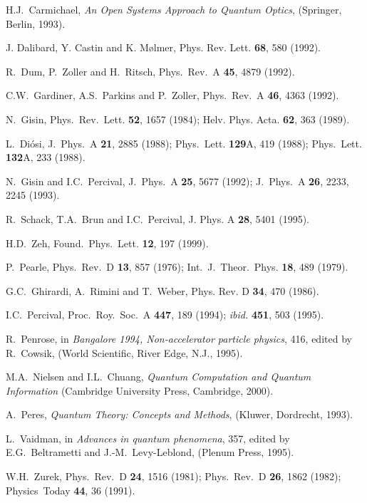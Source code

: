 \documentclass[12pt]{article}
\begin{document}
\begin{thebibliography}{99}

 H.J.~Carmichael,
{\sl An Open Systems Approach to Quantum Optics},
(Springer, Berlin, 1993).

 J. Dalibard, Y. Castin and K. M\o lmer,
Phys. Rev. Lett. {\bf 68}, 580 (1992).

 R.~Dum, P.~Zoller and H.~Ritsch, Phys.~Rev.~A {\bf 45},
4879 (1992).

 C.W.~Gardiner, A.S.~Parkins and P.~Zoller,
Phys.~Rev.~A {\bf 46}, 4363 (1992).

 N.~Gisin, Phys.~Rev.~Lett. {\bf 52}, 1657 (1984);
Helv. Phys. Acta. {\bf 62}, 363 (1989).

 L.~Di\'osi, J.~Phys.~A {\bf 21}, 2885 (1988);
Phys.~Lett. {\bf 129}A, 419 (1988); Phys.~Lett.
{\bf 132}A, 233 (1988).

 N.~Gisin and I.C.~Percival, J.~Phys.~A {\bf 25}, 5677 (1992);
J.~Phys.~A {\bf 26}, 2233, 2245 (1993).

 R.~Schack, T.A.~Brun and I.C.~Percival, 
J. Phys. A {\bf 28}, 5401 (1995).

 H.D.~Zeh, Found.~Phys.~Lett. {\bf 12}, 197 (1999).

 P.~Pearle, Phys.~Rev.~D {\bf 13}, 857 (1976);
Int.~J.~Theor.~Phys. {\bf 18}, 489 (1979).

 G.C.~Ghirardi, A.~Rimini and T.~Weber,
Phys. Rev. D {\bf 34}, 470 (1986).

 I.C.~Percival, Proc.~Roy.~Soc.~A {\bf 447}, 189 (1994);
{\it ibid.\/} {\bf 451}, 503 (1995).

 R.~Penrose, in {\sl Bangalore 1994, Non-accelerator
particle physics}, 416, edited by R.~Cowsik,
(World Scientific, River Edge, N.J., 1995).

  M.A.~Nielsen and I.L.~Chuang, {\sl Quantum
Computation and Quantum Information} (Cambridge University Press,
Cambridge, 2000).

 A.~Peres, {\sl Quantum Theory:  Concepts and Methods},
(Kluwer, Dordrecht, 1993).

 L.~Vaidman, in {\sl Advances in quantum phenomena}, 357,
edited by E.G.~Beltrametti and J.-M.~Levy-Leblond, (Plenum Press, 1995).

 W.H.~Zurek, Phys.~Rev.~D {\bf 24}, 1516 (1981);
Phys.~Rev.~D {\bf 26}, 1862 (1982); Physics~Today {\bf 44}, 36 (1991).


\end{thebibliography}
\end{document}
